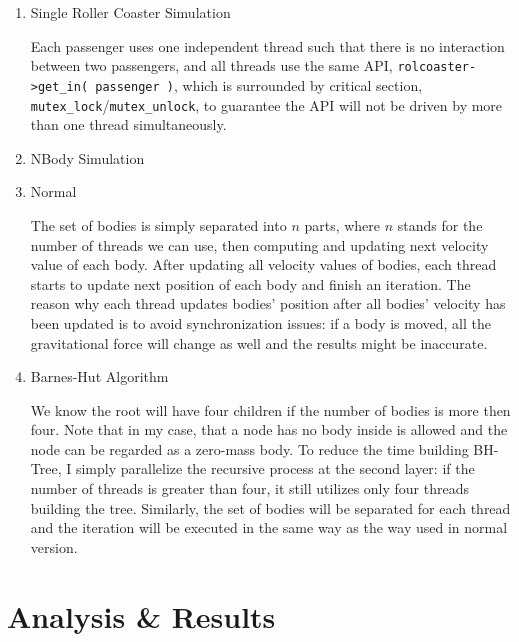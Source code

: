 \documentclass[12pt]{article}
\makeatletter
\renewenvironment{itemize}
{\list{$\bullet$}{\leftmargin\z@ \labelwidth\z@ \itemindent-\leftmargin
\let\makelabel\descriptionlabel}}
{\endlist}
\makeatother
\begin{document}
\begin{enumerate}
	\item Single Roller Coaster Simulation
	\begin{flushleft}
		Each passenger uses one independent thread such that there is no interaction between two passengers, and all threads use the same API, \texttt{rolcoaster->get\_in( passenger )}, which is surrounded by critical section, \texttt{mutex\_lock}/\texttt{mutex\_unlock}, to guarantee the API will not be driven by more than one thread simultaneously.
	\end{flushleft}

	\item NBody Simulation
	\begin{itemize}
		\item Normal
		\begin{flushleft}
			The set of bodies is simply separated into $n$ parts, where $n$ stands for the number of threads we can use, then computing and updating next velocity value of each body. After updating all velocity values of bodies, each thread starts to update next position of each body and finish an iteration. The reason why each thread updates bodies' position after all bodies' velocity has been updated is to avoid synchronization issues: if a body is moved, all the gravitational force will change as well and the results might be inaccurate.
		\end{flushleft}
		\item Barnes-Hut Algorithm
		\begin{flushleft}
			We know the root will have four children if the number of bodies is more then four. Note that in my case, that a node has no body inside is allowed and the node can be regarded as a zero-mass body. To reduce the time building BH-Tree, I simply parallelize the recursive process at the second layer: if the number of threads is greater than four, it still utilizes only four threads building the tree. Similarly, the set of bodies will be separated for each thread and the iteration will be executed in the same way as the way used in normal version.
		\end{flushleft}
	\end{itemize}
\end{enumerate}

\newpage

\section*{Analysis \& Results}
\vspace{-20pt}
\noindent\makebox[\linewidth]{\rule{\textwidth}{0.4pt}}
\end{document}
